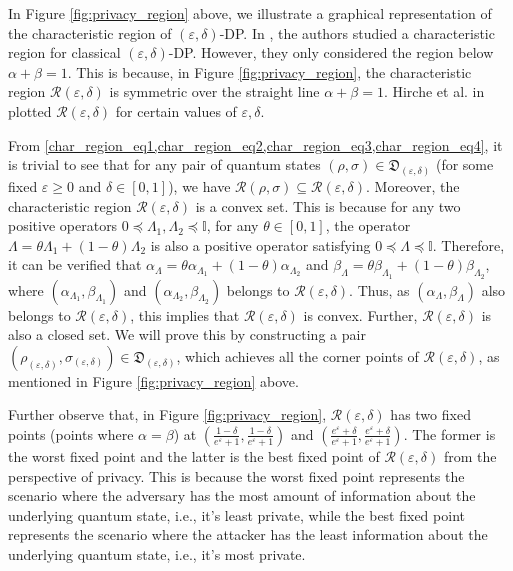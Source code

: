 \documentclass[onecolumn,ldraftcls, 11pt]{IEEEtran}
\newcommand{\eps}{\varepsilon}
\newcommand*{\bbI}{\mathbb{I}}
\newcommand*{\cR}{\mathcal{R}}
\begin{document}
In Figure \ref{fig:privacy_region} above, we illustrate a graphical representation of the characteristic region of $(\eps,\delta)$-DP. In \cite{KOV15}, the authors studied a characteristic region for classical $(\eps,\delta)$-DP. However, they only considered the region below $\alpha + \beta=1$. This is because, in Figure \ref{fig:privacy_region}, the characteristic region  $\cR(\eps,\delta)$ is symmetric over the straight line $\alpha + \beta=1$. Hirche et al. in \cite{HRF23} plotted $ \cR(\eps,\delta)$ for certain values of $\eps, \delta$.

From \cref{char_region_eq1,char_region_eq2,char_region_eq3,char_region_eq4}, it is trivial to see that for any pair of quantum states $(\rho,\sigma) \in \mathfrak{D}_{(\eps,\delta)}$ (for some fixed $\eps \geq 0$ and $\delta \in [0,1]$), we have $\cR(\rho,\sigma) \subseteq \cR(\eps,\delta)$. 
Moreover, the characteristic region $\cR(\eps,\delta)$ is a convex set. This is because for any two positive operators $0 \preceq \Lambda_1, \Lambda_2 \preceq \bbI$, for any $\theta \in [0,1]$, the operator $\Lambda = \theta \Lambda_1 + (1-\theta) \Lambda_2$ is also a positive operator satisfying $0 \preceq \Lambda \preceq \bbI$. Therefore, it can be verified that $\alpha _\Lambda = \theta \alpha_{\Lambda_1} + (1-\theta) \alpha_{\Lambda_2}$ and $\beta _{\Lambda} = \theta \beta_{\Lambda_1} + (1-\theta) \beta_{\Lambda_2}$, where $(\alpha_{\Lambda_1},\beta_{\Lambda_1})$ and  $(\alpha_{\Lambda_2},\beta_{\Lambda_2})$ belongs to $\cR(\eps,\delta)$. Thus, as $(\alpha_{\Lambda},\beta_{\Lambda})$ also belongs to $\cR(\eps,\delta)$, this implies that $\cR(\eps,\delta)$ is convex. Further, $\cR(\eps,\delta)$ is also a closed set. We will prove this by constructing a pair $(\rho_{(\eps,\delta)},\sigma_{(\eps,\delta)}) \in \mathfrak{D_{(\eps,\delta)}}$, which achieves all the corner points of $\cR(\eps,\delta)$, as mentioned in Figure \ref{fig:privacy_region} above.

Further observe that, in Figure \ref{fig:privacy_region}, $\cR(\eps,\delta)$ has two fixed points (points where $\alpha = \beta$) at $(\frac{1-\delta}{e^\eps+1}, \frac{1-\delta}{e^\eps+1})$ and $(\frac{e^\eps + 
\delta}{e^\eps+1}, \frac{e^\eps +  \delta}{e^\eps+1})$. The former is the worst fixed point and the latter is the best fixed point of $\cR(\eps,\delta)$ from the perspective of privacy. This is because the worst fixed point represents the scenario where the adversary has the most amount of information about the underlying quantum state, i.e., it's least private, while the best fixed point represents the scenario where the attacker has the least information about the underlying quantum state, i.e., it's most private.
\end{document}
